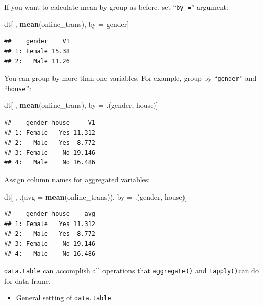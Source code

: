 \documentclass[12pt,]{krantz}
\makeatletter
\newenvironment{Shaded}{\begin{snugshade}}{\end{snugshade}}
\newcommand{\DataTypeTok}[1]{\textcolor[rgb]{0.27,0.27,0.27}{#1}}
\newcommand{\KeywordTok}[1]{\textcolor[rgb]{0.27,0.27,0.27}{\textbf{#1}}}
\newcommand{\NormalTok}[1]{#1}
\newcommand{\StringTok}[1]{\textcolor[rgb]{0.5,0.5,0.5}{#1}}
\providecommand{\tightlist}{%
  \setlength{\itemsep}{0pt}\setlength{\parskip}{0pt}}
\newenvironment{kframe}{%
\medskip{}
\setlength{\fboxsep}{.8em}
 \def\at@end@of@kframe{}%
 \ifinner\ifhmode%
  \def\at@end@of@kframe{\end{minipage}}%
  \begin{minipage}{\columnwidth}%
 \fi\fi%
 \def\FrameCommand##1{\hskip\@totalleftmargin \hskip-\fboxsep
 \colorbox{shadecolor}{##1}\hskip-\fboxsep
     \hskip-\linewidth \hskip-\@totalleftmargin \hskip\columnwidth}%
 \MakeFramed {\advance\hsize-\width
   \@totalleftmargin\z@ \linewidth\hsize
   \@setminipage}}%
 {\par\unskip\endMakeFramed%
 \at@end@of@kframe}
\renewenvironment{Shaded}{\begin{kframe}}{\end{kframe}}
\makeatother
\begin{document}
If you want to calculate mean by group as before, set ``\texttt{by\ =}'' argument:

\begin{Shaded}
\begin{Highlighting}[]
\NormalTok{dt[ , }\KeywordTok{mean}\NormalTok{(online_trans), by =}\StringTok{ }\NormalTok{gender]}
\end{Highlighting}
\end{Shaded}

\begin{verbatim}
##    gender    V1
## 1: Female 15.38
## 2:   Male 11.26
\end{verbatim}

You can group by more than one variables. For example, group by ``\texttt{gender}'' and ``\texttt{house}'':

\begin{Shaded}
\begin{Highlighting}[]
\NormalTok{dt[ , }\KeywordTok{mean}\NormalTok{(online_trans), by =}\StringTok{ }\NormalTok{.(gender, house)]}
\end{Highlighting}
\end{Shaded}

\begin{verbatim}
##    gender house     V1
## 1: Female   Yes 11.312
## 2:   Male   Yes  8.772
## 3: Female    No 19.146
## 4:   Male    No 16.486
\end{verbatim}

Assign column names for aggregated variables:

\begin{Shaded}
\begin{Highlighting}[]
\NormalTok{dt[ , .(}\DataTypeTok{avg =} \KeywordTok{mean}\NormalTok{(online_trans)), by =}\StringTok{ }\NormalTok{.(gender, house)]}
\end{Highlighting}
\end{Shaded}

\begin{verbatim}
##    gender house    avg
## 1: Female   Yes 11.312
## 2:   Male   Yes  8.772
## 3: Female    No 19.146
## 4:   Male    No 16.486
\end{verbatim}

\texttt{data.table} can accomplish all operations that \texttt{aggregate()} and \texttt{tapply()}can do for data frame.

\begin{itemize}
\tightlist
\item
  General setting of \texttt{data.table}
\end{itemize}
\end{document}
